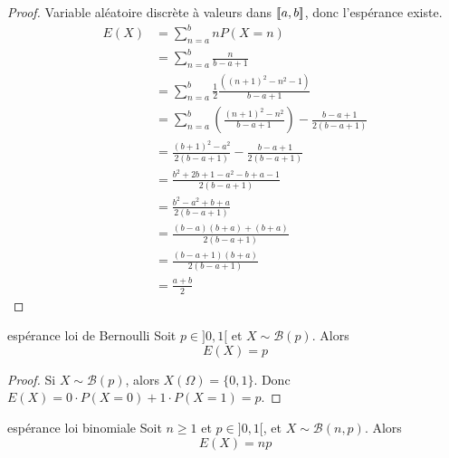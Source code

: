 \begin{proof}
    Variable aléatoire discrète à valeurs dans $[\![a, b]\!]$, donc l'espérance existe. 
    \begin{align}
        E(X) & = \sum_{n = a}^b n P(X = n) \\
        & = \sum_{n = a}^b \frac n {b - a + 1} \\
        & = \sum_{n = a }^{b } \frac 1 2 \frac{((n + 1)^2 - n^2 - 1)}{b - a + 1} \\
        & = \sum_{n = a }^{b } \left( \frac {(n + 1)^2 - n^2}{b - a + 1} \right) - \frac {b - a + 1} {2 (b - a + 1)} \\
        & = \frac{(b + 1)^2 - a^2}{2 (b - a + 1)} - \frac{b - a + 1}{2 (b - a + 1)} \\
        & = \frac{b^2 + 2b + 1 - a^2 - b + a - 1}{2 (b - a + 1)} \\
        & = \frac{b^2 - a^2 + b + a}{2 (b - a + 1)} \\
        & = \frac{(b - a)(b + a) + (b + a)}{2 ( b - a + 1)} \\
        & = \frac{(b - a + 1)(b + a)}{2 (b - a + 1)} \\
        & = \frac{a + b}{2}
    \end{align}

\end{proof}

\begin{proposition}{espérance loi de Bernoulli}{}
    Soit $p \in ]0, 1[$ et $X \sim \mathcal B(p)$. Alors 
    $$ E(X) = p $$
\end{proposition}

\begin{proof}
    Si $X \sim \mathcal B(p)$, alors $X(\Omega) = \{0, 1\}$.
    Donc $E(X) = 0 \cdot P(X = 0) + 1 \cdot P(X = 1) = p$.
\end{proof}

\begin{proposition}{espérance loi binomiale}{}
    Soit $n \geqslant 1$ et $p \in ]0, 1[$, et $X \sim \mathcal B(n, p)$. Alors 
    $$ E(X) = n p $$
\end{proposition}

